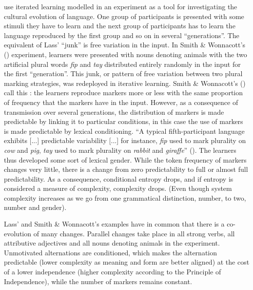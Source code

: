 \documentclass[output=collectionpaper]{langsci/langscibook}
\begin{document}
\cite{Smith2010} use iterated learning modelled in an experiment as a tool for investigating the cultural evolution of language. One group of participants is presented with some stimuli they have to learn and the next group of participants has to learn the language reproduced by the first group and so on in several ``generations''. The equivalent of Lass' ``junk'' is free variation in the input. In Smith \& Wonnacott's (\citealt*{Smith2010}) experiment, learners were presented with nouns denoting animals with the two artificial plural words \textit{fip} and \textit{tay} distributed entirely randomly in the input for the first ``generation''. This junk, or pattern of free variation between two plural marking strategies, was redeployed in iterative learning. Smith \& Wonnacott's (\citealt*{Smith2010}) call this : the learners reproduce markers more or less with the same proportion of frequency that the markers have in the input. However, as a consequence of transmission over several generations, the distribution of markers is made predictable by linking it to particular conditions, in this case the use of markers is made predictable by lexical conditioning. ``A typical fifth-participant language exhibits [...] predictable variability [...] for instance, \textit{fip} used to mark plurality on \textit{cow} and \textit{pig}, \textit{tay} used to mark plurality on \textit{rabbit} and \textit{giraffe}'' (\citealt[447]{Smith2010}). The learners thus developed some sort of lexical gender. While the token frequency of markers changes very little, there is a change from zero predictability to full or almost full predictability. As a consequence, conditional entropy drops, and if entropy is considered a measure of complexity, complexity drops. (Even though system complexity increases as we go from one grammatical distinction, number, to two, number and gender).

Lass' and Smith \& Wonnacott's examples have in common that there is a co-evolution of many changes. Parallel changes take place in all  strong verbs, all  attributive adjectives and all nouns denoting animals in the experiment. Unmotivated alternations are conditioned, which makes the alternation predictable (lower complexity as meaning and form are better aligned) at the cost of a lower independence (higher complexity according to the Principle of Independence), while the number of markers remains constant.
\end{document}
